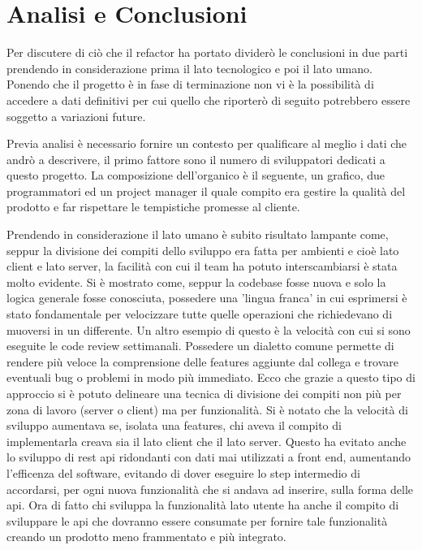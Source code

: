 \chapter{Analisi e Conclusioni}
\label{cha:intro}
\vspace{5mm}

Per discutere di ciò che il refactor ha portato dividerò le conclusioni in due parti prendendo in considerazione prima il lato tecnologico e poi il lato umano. Ponendo che il progetto è in fase di terminazione non vi è la possibilità di accedere a dati definitivi per cui quello che riporterò di seguito potrebbero essere soggetto a variazioni future.\vspace{5mm}

 Previa analisi è necessario fornire un contesto per qualificare al meglio i dati che andrò a descrivere, il primo fattore sono il numero di sviluppatori dedicati a questo progetto. La composizione dell'organico è il seguente, un grafico, due programmatori ed un project manager il quale compito era gestire la qualità del prodotto e far rispettare le tempistiche promesse al cliente.\vspace{5mm}

Prendendo in considerazione il lato umano è subito risultato lampante come, seppur la divisione dei compiti dello sviluppo era fatta per ambienti e cioè lato client e lato server, la facilità con cui il team ha potuto interscambiarsi è stata molto evidente. Si è mostrato come, seppur la codebase fosse nuova e solo la logica generale fosse conosciuta, possedere una 'lingua franca' in cui esprimersi è stato fondamentale per velocizzare tutte quelle operazioni che richiedevano di muoversi in un differente. Un altro esempio di questo è la velocità con cui si sono eseguite le code review settimanali. Possedere un dialetto comune permette di rendere più veloce la comprensione delle features aggiunte dal collega e trovare eventuali bug o problemi in modo più immediato. Ecco che grazie a questo tipo di approccio si è potuto delineare una tecnica di divisione dei compiti non più per zona di lavoro (server o client) ma per funzionalità. Si è notato che la velocità di sviluppo aumentava se, isolata una features, chi aveva il compito di implementarla creava sia il lato client che il lato server. Questo ha evitato anche lo sviluppo di rest api ridondanti con dati mai utilizzati a front end, aumentando l'efficenza del software, evitando di dover eseguire lo step intermedio di accordarsi, per ogni nuova funzionalità che si andava ad inserire, sulla forma delle api. Ora di fatto chi sviluppa la funzionalità lato utente ha anche il compito di sviluppare le api che dovranno essere consumate per fornire tale funzionalità creando un prodotto meno frammentato e più integrato. \vspace{5mm}

